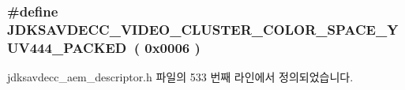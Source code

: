 \subsubsection[{\texorpdfstring{J\+D\+K\+S\+A\+V\+D\+E\+C\+C\+\_\+\+V\+I\+D\+E\+O\+\_\+\+C\+L\+U\+S\+T\+E\+R\+\_\+\+C\+O\+L\+O\+R\+\_\+\+S\+P\+A\+C\+E\+\_\+\+Y\+U\+V444\+\_\+\+P\+A\+C\+K\+ED}{JDKSAVDECC_VIDEO_CLUSTER_COLOR_SPACE_YUV444_PACKED}}]{\setlength{\rightskip}{0pt plus 5cm}\#define J\+D\+K\+S\+A\+V\+D\+E\+C\+C\+\_\+\+V\+I\+D\+E\+O\+\_\+\+C\+L\+U\+S\+T\+E\+R\+\_\+\+C\+O\+L\+O\+R\+\_\+\+S\+P\+A\+C\+E\+\_\+\+Y\+U\+V444\+\_\+\+P\+A\+C\+K\+ED~( 0x0006 )}\hypertarget{group__video__cluster__color__space_ga8042d3b9ebc557058ba76df35887e2f7}{}\label{group__video__cluster__color__space_ga8042d3b9ebc557058ba76df35887e2f7}


jdksavdecc\+\_\+aem\+\_\+descriptor.\+h 파일의 533 번째 라인에서 정의되었습니다.

